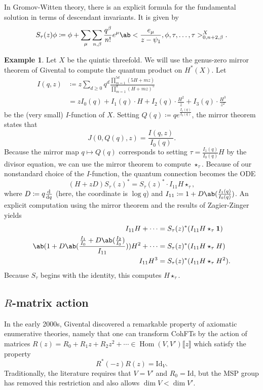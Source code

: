 \documentclass[10pt]{amsart}
\theoremstyle{definition}
\newtheorem{exm}[thm]{Example}
\theoremstyle{remark}
\theoremstyle{plain}
\theoremstyle{definition}
\theoremstyle{remark}
\newcommand{\mr}[1]{\mathrm{#1}}
\newcommand{\1}{\mathbf{1}}
\newcommand{\2}{\mathbf{2}}
\newcommand{\3}{\mathbf{3}}
\newcommand{\ps}[1]{\llbracket #1 \rrbracket}
\DeclareMathOperator{\Hom}{Hom}
\begin{document}
In Gromov-Witten theory, there is an explicit formula for the fundamental solution in terms of descendant invariants. It is given by
\[ S_{\tau}(z) \phi \coloneqq \phi + \sum_{\mu} \sum_{n,\beta} \frac{q^{\beta}}{n!} e^{\mu} \ab<\frac{e_{\mu}}{z-\psi_1}, \phi, \tau, \ldots, \tau>_{0,n+2,\beta}^{X}. \]

\begin{exm}
    Let $X$ be the quintic threefold. We will use the genus-zero mirror theorem of Givental to compute the quantum product on $H^*(X)$. Let
    \begin{align*}
        I(q,z) &\coloneqq z \sum_{d \geq 0} q^d \frac{\prod_{m=1}^{5d} (5H+mz)}{\prod_{m=1}^d (H+mz)^5}  \\
        &= z I_0(q) + I_1(q) \cdot H + I_2(q) \cdot \frac{H^2}{z} + I_3(q) \cdot \frac{H^3}{z^2}
    \end{align*}
    be the (very small) $I$-function of $X$. Setting $Q(q) \coloneqq q e^{\frac{I_1(q)}{I_0(q)}}$, the mirror theorem states that
    \[ J(0,Q(q),z) = \frac{I(q,z)}{I_0(q)}. \]
    Because the mirror map $q \mapsto Q(q)$ corresponds to setting $\tau = \frac{I_1(q)}{I_0(q)} H$ by the divisor equation, we can use the mirror theorem to compute $\star_{\tau}$. Because of our nonstandard choice of the $I$-function, the quantum connection becomes the ODE
    \[ (H+zD) S_{\tau}(z)^* = S_{\tau}(z)^* \cdot I_{11} H \star_{\tau}, \]
    where $D \coloneqq q \odv{}{q}$ (here, the coordinate is $\log q$) and $I_{11} \coloneqq 1 + D \ab(\frac{I_1(q)}{I_0(q)})$. An explicit computation using the mirror theorem and the results of Zagier-Zinger yields
    \begin{align*}
        I_{11} H + \cdots &= S_{\tau}(z)^* (I_{11} H \star_{\tau} \1) \\
        \ab( 1 + D\ab(\frac{\frac{I_1}{I_0} + D \ab(\frac{I_2}{I_0})}{I_{11}}) ) H^2 + \cdots &= S_{\tau}(z)^* (I_{11} H \star_{\tau} H) \\
        I_{11} H^3 &= S_{\tau}(z)^* (I_{11}H \star_{\tau} H^2).
    \end{align*}
    Because $S_{\tau}$ begins with the identity, this computes $H \star_{\tau}$.
\end{exm}


\subsection{$R$-matrix action}%
\label{sub:R-matrix action}

In the early 2000s, Givental discovered a remarkable property of axiomatic enumerative theories, namely that one can transform CohFTs by the action of matrices $R(z) = R_0 + R_1 z + R_2 z^2 + \cdots \in \Hom(V, V')\ps{z}$ which satisfy the property
\[ R^*(-z) R(z) = \mr{Id}_V. \]
Traditionally, the literature requires that $V = V'$ and $R_0 = \mr{Id}$, but the MSP group has removed this restriction and also allows $\dim V < \dim V'$.
\end{document}
